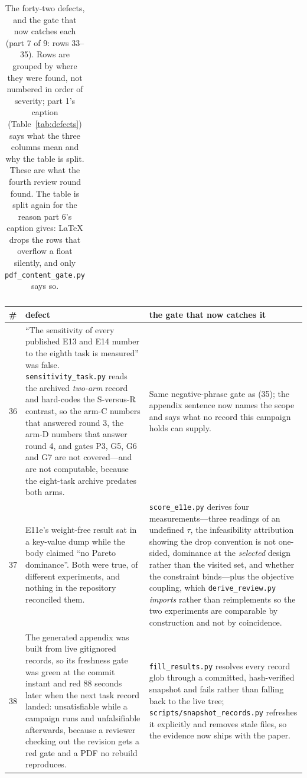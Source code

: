 \documentclass{article}
\begin{document}
\begin{table}[p]
\begin{tabular}{@{}p{0.6cm}p{7.3cm}p{7.3cm}@{}}
\bottomrule
\end{tabular}
\caption{The forty-two defects, and the gate that now catches each (part 7 of 9: rows 33--35).  Rows are grouped by where they were found, not numbered in order of severity; part 1's caption (Table~\ref{tab:defects}) says what the three columns mean and why the table is split.  These are what the fourth review round found.  The table is split again for the reason part 6's caption gives: LaTeX drops the rows that overflow a float silently, and only \texttt{pdf\_content\_gate.py} says so.}
\label{tab:defectsg}
\end{table}

\begin{table}[p]
\centering
\small\sloppy
\setlength{\tabcolsep}{4pt}
\begin{tabular}{@{}p{0.6cm}p{7.3cm}p{7.3cm}@{}}
\toprule
\# & defect & the gate that now catches it \\
\midrule
36 & ``The sensitivity of every published E13 and E14 number to the eighth task is measured'' was false.  \texttt{sensitivity\_task.py} reads the archived \emph{two-arm} record and hard-codes the S-versus-R contrast, so the arm-C numbers that answered round 3, the arm-D numbers that answer round 4, and gates P3, G5, G6 and G7 are not covered---and are not computable, because the eight-task archive predates both arms. & Same negative-phrase gate as (35); the appendix sentence now names the scope and says what no record this campaign holds can supply. \\
37 & E11e's weight-free result sat in a key-value dump while the body claimed ``no Pareto dominance''.  Both were true, of different experiments, and nothing in the repository reconciled them. & \texttt{score\_e11e.py} derives four measurements---three readings of an undefined $\tau$, the infeasibility attribution showing the drop convention is not one-sided, dominance at the \emph{selected} design rather than the visited set, and whether the constraint binds---plus the objective coupling, which \texttt{derive\_review.py} \emph{imports} rather than reimplements so the two experiments are comparable by construction and not by coincidence. \\
38 & The generated appendix was built from live gitignored records, so its freshness gate was green at the commit instant and red $88$ seconds later when the next task record landed: unsatisfiable while a campaign runs and unfalsifiable afterwards, because a reviewer checking out the revision gets a red gate and a PDF no rebuild reproduces. & \texttt{fill\_results.py} resolves every record glob through a committed, hash-verified snapshot and fails rather than falling back to the live tree; \texttt{scripts/snapshot\_records.py} refreshes it explicitly and removes stale files, so the evidence now ships with the paper. \\

\end{tabular}
\end{table}
\end{document}
